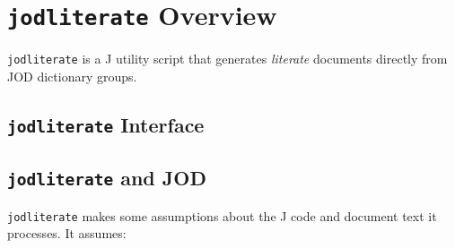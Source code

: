 \section{\texttt{jodliterate} Overview}

\texttt{jodliterate} is a J utility script that generates
\emph{literate} documents directly from JOD dictionary groups.

\subsection{\texttt{jodliterate} Interface}

\begin{Shaded}
\begin{Highlighting}[]
\hyperlink{grplit}{}
\hyperlink{setjodliterate}{}
\hyperlink{ifacesection}{}
\end{Highlighting}
\end{Shaded}


\subsection{\texttt{jodliterate} and JOD}

\texttt{jodliterate} makes some assumptions about the J code and
document text it processes. It assumes:

